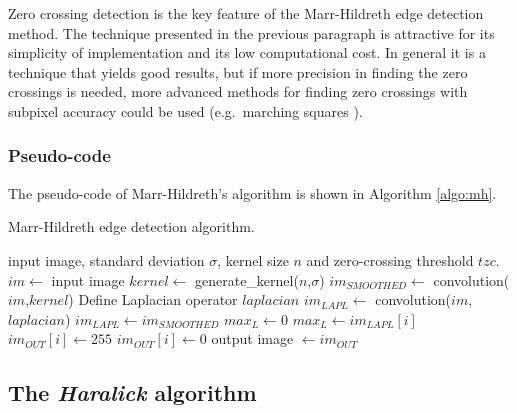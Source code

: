 \documentclass{ipol}
\numberwithin{equation}{section}
\numberwithin{table}{section}
\begin{document}
Zero crossing detection is the key feature of the Marr-Hildreth edge detection method. The technique 
presented in the previous paragraph is attractive for its simplicity of implementation and its low 
computational cost. In general it is a technique that yields good results, but if more precision in 
finding the zero crossings is needed, more advanced methods for finding zero crossings with subpixel 
accuracy could be used (e.g.\ marching squares \cite{marching_cubes}).


\subsubsection{Pseudo-code}

The pseudo-code of Marr-Hildreth's algorithm is shown in Algorithm \ref{algo:mh}.

\begin{algorithm}[t!]
\caption{Marr-Hildreth edge detection algorithm.}
\label{algo:mh}
\begin{algorithmic}[1]
\REQUIRE input image, standard deviation $\sigma$, kernel size $n$ and zero-crossing threshold $tzc$.
\STATE $im \leftarrow$ input image
\STATE $kernel \leftarrow$ generate\_kernel($n$,$\sigma$) 
\STATE $im_{SMOOTHED} \leftarrow$ convolution($im$,$kernel$)
	\STATE Define Laplacian operator $laplacian$
	\STATE $im_{LAPL} \leftarrow$ convolution($im$,$laplacian$)
\ELSE
	\STATE $im_{LAPL} \leftarrow im_{SMOOTHED}$
\ENDIF
\STATE $max_L \leftarrow 0$
		\STATE $max_L \leftarrow im_{LAPL}[i]$
	\ENDIF
\ENDFOR
{}
			\STATE $im_{OUT}[i] \leftarrow 255$
		\ELSE
			\STATE $im_{OUT}[i] \leftarrow 0$
		\ENDIF
	\ENDFOR
\ENDFOR
\RETURN output image $\leftarrow im_{OUT}$
\end{algorithmic}
\end{algorithm}


\subsection{The \textit{Haralick} algorithm}
\end{document}
